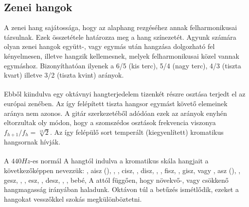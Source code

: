 \subsection{Zenei hangok}
\label{sec:zeneihangok}
A zenei hang sajátossága, hogy az alaphang rezgéséhez annak felharmonikusai társulnak. Ezek összetétele határozza meg a hang színezetét. Agyunk számára olyan zenei hangok együtt-, vagy egymás után hangzása dolgozható fel kényelmesen, illetve hangzik kellemesnek, melyek felharmonikusai közel vannak egymáshoz. Bizonyíthatóan ilyenek a 6/5 (kis terc), 5/4 (nagy terc), 4/3 (tiszta kvart) illetve 3/2 (tiszta kvint) arányok. \\\\
Ebből kiindulva egy oktávnyi hangterjedelem tizenkét részre osztása terjedt el az európai zenében.
Az így felépített tiszta hangsor egymást követő elemeinek aránya nem azonos. A gitár szerkezetéből adódóan ezek az arányok enyhén eltorzultak oly módon, hogy a szomszédos osztások frekvencia viszonya $f_{h+1}/f_{h}=\sqrt[12]{2}$. Az így felépülő sort temperált (kiegyenlített) kromatikus hangsornak hívják. \\\\
A $440Hz$-es normál A hangtól indulva a kromatikus skála hangjait a következőképpen nevezzük: , aisz (), , , cisz, , disz, , , fisz, , gisz,  vagy , asz (), , gesz, , , esz, , desz, , , bebé, A attól függően, hogy növekvő-, vagy csökkenő hangmagasság irányában haladunk. Oktávon túl a betűzés ismétlődik, ezeket a hangokat vesszőkkel szokás megkülönböztetni.
